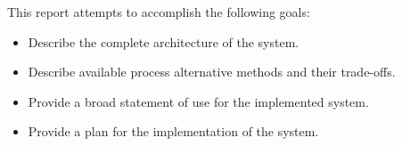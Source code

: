 This report attempts to accomplish the following goals:
\begin{itemize}
  \item Describe the complete architecture of the system.
  \item Describe available process alternative methods and their trade-offs.
  \item Provide a broad statement of use for the implemented system.
  \item Provide a plan for the implementation of the system.
\end{itemize}